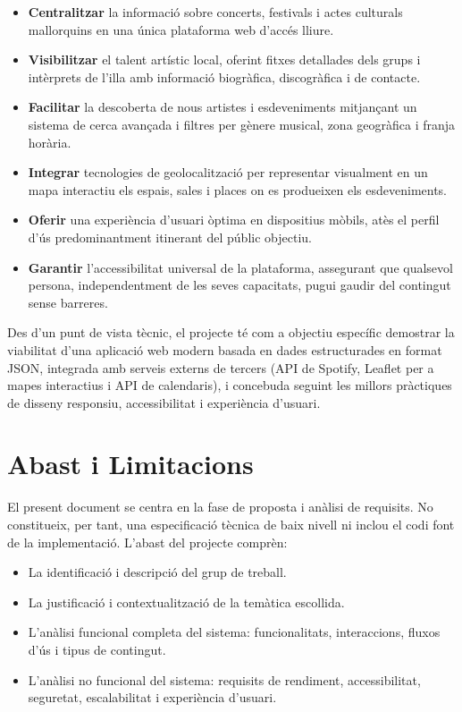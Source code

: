 \begin{itemize}
    \item \textbf{Centralitzar} la informació sobre concerts, festivals i actes culturals mallorquins en una única plataforma web d'accés lliure.
    \item \textbf{Visibilitzar} el talent artístic local, oferint fitxes detallades dels grups i intèrprets de l'illa amb informació biogràfica, discogràfica i de contacte.
    \item \textbf{Facilitar} la descoberta de nous artistes i esdeveniments mitjançant un sistema de cerca avançada i filtres per gènere musical, zona geogràfica i franja horària.
    \item \textbf{Integrar} tecnologies de geolocalització per representar visualment en un mapa interactiu els espais, sales i places on es produeixen els esdeveniments.
    \item \textbf{Oferir} una experiència d'usuari òptima en dispositius mòbils, atès el perfil d'ús predominantment itinerant del públic objectiu.
    \item \textbf{Garantir} l'accessibilitat universal de la plataforma, assegurant que qualsevol persona, independentment de les seves capacitats, pugui gaudir del contingut sense barreres.
\end{itemize}

Des d'un punt de vista tècnic, el projecte té com a objectiu específic demostrar la viabilitat d'una aplicació web modern basada en dades estructurades en format JSON, integrada amb serveis externs de tercers (API de Spotify, Leaflet per a mapes interactius i API de calendaris), i concebuda seguint les millors pràctiques de disseny responsiu, accessibilitat i experiència d'usuari.

\section{Abast i Limitacions}

El present document se centra en la fase de proposta i anàlisi de requisits. No constitueix, per tant, una especificació tècnica de baix nivell ni inclou el codi font de la implementació. L'abast del projecte comprèn:

\begin{itemize}
    \item La identificació i descripció del grup de treball.
    \item La justificació i contextualització de la temàtica escollida.
    \item L'anàlisi funcional completa del sistema: funcionalitats, interaccions, fluxos d'ús i tipus de contingut.
    \item L'anàlisi no funcional del sistema: requisits de rendiment, accessibilitat, seguretat, escalabilitat i experiència d'usuari.
\end{itemize}

